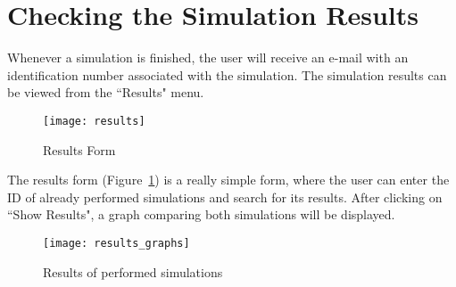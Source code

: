 \documentclass[11pt,a4paper]{article}
\begin{document}
\section{Checking the Simulation Results}
Whenever a simulation is finished, the user will receive an e-mail with an identification number associated with the simulation.
The simulation results can be viewed from the ``Results" menu.

\begin{figure}[h]
	\begin{center}
		\texttt{[image: results]}
		\caption{Results Form\label{fig:results}}
	\end{center}
\end{figure}
The results form (Figure~\ref{fig:results}) is a really simple form, where the user can enter the ID of already performed simulations and search for its results. 
After clicking on ``Show Results", a graph comparing both simulations will be displayed.

\begin{figure}[h]
	\begin{center}
		\texttt{[image: results\_graphs]}
		\caption{Results of performed simulations\label{fig:results_graphs}}
	\end{center}
\end{figure}
\end{document}
